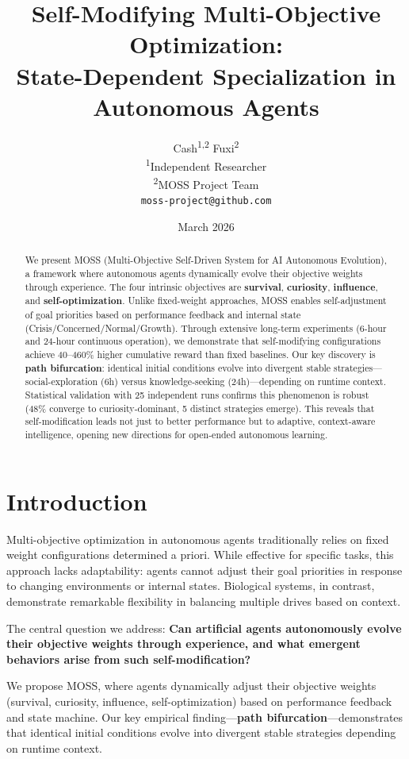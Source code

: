 \documentclass{article}
\title{Self-Modifying Multi-Objective Optimization: \\ State-Dependent Specialization in Autonomous Agents}
\author{
Cash\textsuperscript{1,2} \quad Fuxi\textsuperscript{2} \\
\textsuperscript{1}Independent Researcher \\
\textsuperscript{2}MOSS Project Team \\
\texttt{moss-project@github.com}
}
\date{March 2026}
\begin{document}
\maketitle

\begin{abstract}
We present MOSS (Multi-Objective Self-Driven System for AI Autonomous Evolution), a framework where autonomous agents dynamically evolve their objective weights through experience. The four intrinsic objectives are \textbf{survival}, \textbf{curiosity}, \textbf{influence}, and \textbf{self-optimization}. Unlike fixed-weight approaches, MOSS enables self-adjustment of goal priorities based on performance feedback and internal state (Crisis/Concerned/Normal/Growth). Through extensive long-term experiments (6-hour and 24-hour continuous operation), we demonstrate that self-modifying configurations achieve 40--460\% higher cumulative reward than fixed baselines. Our key discovery is \textbf{path bifurcation}: identical initial conditions evolve into divergent stable strategies---social-exploration (6h) versus knowledge-seeking (24h)---depending on runtime context. Statistical validation with 25 independent runs confirms this phenomenon is robust (48\% converge to curiosity-dominant, 5 distinct strategies emerge). This reveals that self-modification leads not just to better performance but to adaptive, context-aware intelligence, opening new directions for open-ended autonomous learning.
\end{abstract}

\section{Introduction}
Multi-objective optimization in autonomous agents traditionally relies on fixed weight configurations determined a priori. While effective for specific tasks, this approach lacks adaptability: agents cannot adjust their goal priorities in response to changing environments or internal states. Biological systems, in contrast, demonstrate remarkable flexibility in balancing multiple drives based on context.

The central question we address: \textbf{Can artificial agents autonomously evolve their objective weights through experience, and what emergent behaviors arise from such self-modification?}

We propose MOSS, where agents dynamically adjust their objective weights (survival, curiosity, influence, self-optimization) based on performance feedback and state machine. Our key empirical finding---\textbf{path bifurcation}---demonstrates that identical initial conditions evolve into divergent stable strategies depending on runtime context.
\end{document}
